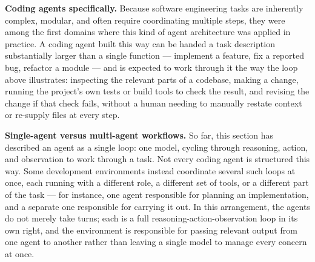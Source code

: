 \textbf{Coding agents specifically.} Because software engineering tasks are inherently complex, modular, and often require coordinating multiple steps, they were among the first domains where this kind of agent architecture was applied in practice. A coding agent built this way can be handed a task description substantially larger than a single function --- implement a feature, fix a reported bug, refactor a module --- and is expected to work through it the way the loop above illustrates: inspecting the relevant parts of a codebase, making a change, running the project's own tests or build tools to check the result, and revising the change if that check fails, without a human needing to manually restate context or re-supply files at every step.

\textbf{Single-agent versus multi-agent workflows.} So far, this section has described an agent as a single loop: one model, cycling through reasoning, action, and observation to work through a task. Not every coding agent is structured this way. Some development environments instead coordinate several such loops at once, each running with a different role, a different set of tools, or a different part of the task --- for instance, one agent responsible for planning an implementation, and a separate one responsible for carrying it out. In this arrangement, the agents do not merely take turns; each is a full reasoning-action-observation loop in its own right, and the environment is responsible for passing relevant output from one agent to another rather than leaving a single model to manage every concern at once.

